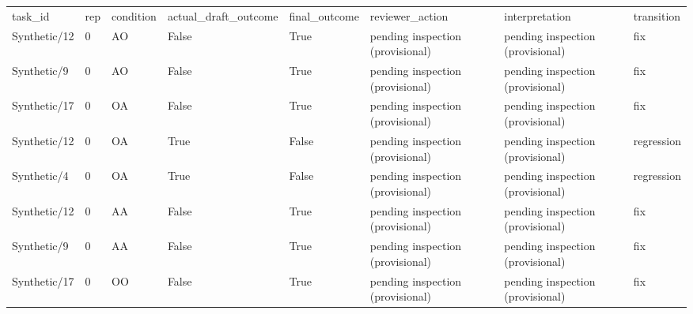 \begin{tabular}{llllllll}
task\_id & rep & condition & actual\_draft\_outcome & final\_outcome & reviewer\_action & interpretation & transition \\
Synthetic/12 & 0 & AO & False & True & pending inspection (provisional) & pending inspection (provisional) & fix \\
Synthetic/9 & 0 & AO & False & True & pending inspection (provisional) & pending inspection (provisional) & fix \\
Synthetic/17 & 0 & OA & False & True & pending inspection (provisional) & pending inspection (provisional) & fix \\
Synthetic/12 & 0 & OA & True & False & pending inspection (provisional) & pending inspection (provisional) & regression \\
Synthetic/4 & 0 & OA & True & False & pending inspection (provisional) & pending inspection (provisional) & regression \\
Synthetic/12 & 0 & AA & False & True & pending inspection (provisional) & pending inspection (provisional) & fix \\
Synthetic/9 & 0 & AA & False & True & pending inspection (provisional) & pending inspection (provisional) & fix \\
Synthetic/17 & 0 & OO & False & True & pending inspection (provisional) & pending inspection (provisional) & fix \\
\end{tabular}
